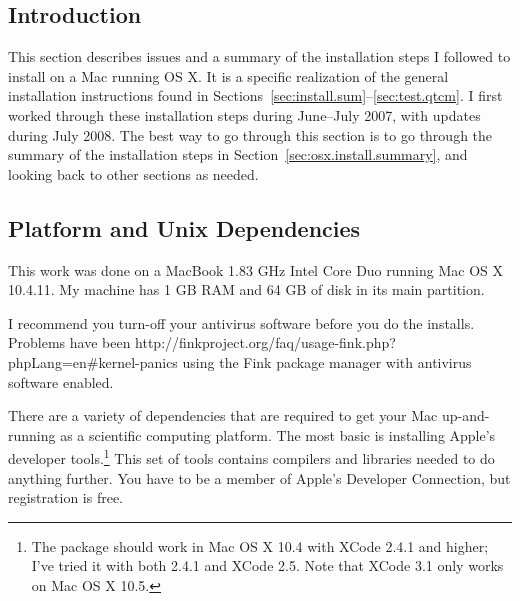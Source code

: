%


%
\subsection{Introduction}

This section describes issues and a summary of the installation steps
I followed to install  on a Mac running OS X.
It is a specific realization of the general installation
instructions found in Sections~\ref{sec:install.sum}--\ref{sec:test.qtcm}.
I first worked through these installation steps during June--July 2007,
with updates during July 2008.
The best way to go through this section is to go through
the summary of the installation steps in 
Section~\ref{sec:osx.install.summary},
and looking back to other sections as needed.




\subsection{Platform and Unix Dependencies}

This work was done on a MacBook 1.83 GHz Intel Core Duo running Mac OS X
10.4.11.  My machine has 1 GB RAM and 64 GB of disk in its main partition.

I recommend you turn-off your antivirus software before you
do the installs.  
Problems have been
%
	{%
		{http://finkproject.org/faq/usage-fink.php?phpLang=en#kernel-panics}}
using the Fink package manager with antivirus software enabled.

There are a variety of dependencies that are required to get your Mac
up-and-running as a scientific computing platform.  The most basic is
installing Apple's 
developer tools.\footnote%
	{The package should work in Mac OS X 10.4 with XCode 2.4.1 and higher;
	I've tried it with both 2.4.1 and XCode 2.5.  Note that
	XCode 3.1 only works on Mac OS X 10.5.}
This set of tools contains compilers and libraries
needed to do anything further.  You have to be a member of Apple's
Developer Connection, but registration is free.

